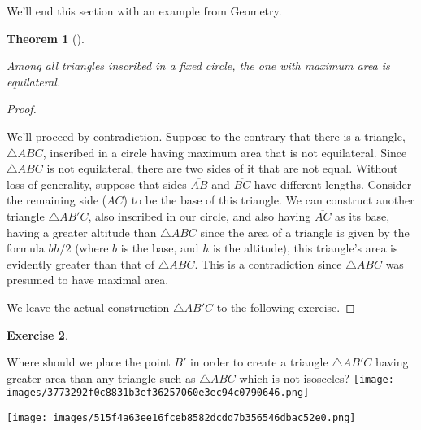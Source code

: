 \documentclass[10pt,]{book}
\theoremstyle{plain}
\newtheorem{theorem}{Theorem}[section]
\theoremstyle{definition}
\theoremstyle{definition}
\newtheorem{exercise}[theorem]{Exercise}
\numberwithin{equation}{section}
\begin{document}
    We'll end this section with an example from Geometry.
\begin{theorem}[{}]\label{theorem-9}

        Among all triangles inscribed in a fixed circle, the one with maximum
        area is equilateral.
\end{theorem}
\begin{proof}\hypertarget{proof-14}{}

      We'll proceed by contradiction. Suppose to the contrary that there is a
      triangle, \(\triangle ABC\), inscribed in a circle having maximum area that
      is not equilateral. Since \(\triangle ABC\) is not equilateral, there are
      two sides of it that are not equal. Without loss of generality, suppose that
      sides \(\overline{AB}\) and \(\overline{BC}\) have different lengths. Consider
      the remaining side (\(\overline{AC}\)) to be the base of this triangle.
      We can construct another triangle \(\triangle AB'C\), also inscribed in our circle, and also
      having \(\overline{AC}\) as its base, having a greater altitude than
      \(\triangle ABC\) \textemdash{} since the area of a triangle is given by
      the formula \(bh/2\) (where \(b\) is the base, and \(h\) is the altitude),
      this triangle's area is evidently greater than that of \(\triangle ABC\).
      This is a contradiction since \(\triangle ABC\) was presumed to have
      maximal area.
\par

      We leave the actual construction \(\triangle AB'C\) to the following exercise.
\end{proof}
\begin{exercise}\label{exercise-20}

        Where should we place the point \(B'\) in order to create a triangle
        \(\triangle AB'C\) having
        greater area than any triangle such as \(\triangle ABC\) which is not isosceles?
\texttt{[image: images/3773292f0c8831b3ef36257060e3ec94c0790646.png]}

      \ifx\SetFigFont\undefined\gdef\SetFigFont#1#2#3#4#5{
        \reset@font\fontsize{#1}{#2pt}
        \fontfamily{#3}\fontseries{#4}\fontshape{#5}
        \selectfont}\fi
      \texttt{[image: images/515f4a63ee16fceb8582dcdd7b356546dbac52e0.png]}
\end{exercise}
\typeout{************************************************}
\typeout{************************************************}
\end{document}
